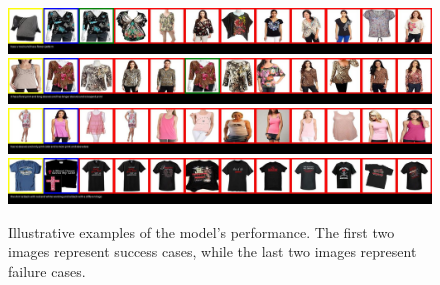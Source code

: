 \begin{figure}[t]
    \centering
    \includegraphics[width=\textwidth]{figures/success1.jpg}
    \includegraphics[width=\textwidth]{figures/success2.jpg}
    \includegraphics[width=\textwidth]{figures/failure1.jpg}
    \includegraphics[width=\textwidth]{figures/failure2.jpg}
    \caption{Illustrative examples of the model's performance. The first two images represent success cases, while the last two images represent failure cases.}
    \label{fig:performance}
\end{figure}

